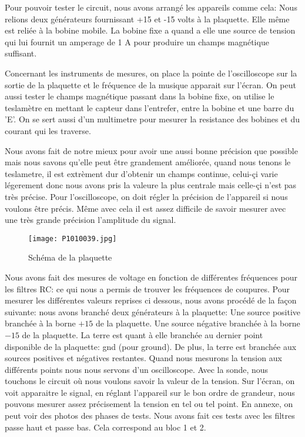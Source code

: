 

Pour pouvoir tester le circuit, nous avons arrangé les appareils comme cela: Nous relions deux générateurs fournissant +15 et
-15 volts à la plaquette. Elle même est reliée à la bobine mobile. La bobine fixe a quand a elle une source de tension qui
lui fournit un amperage de 1 A pour produire un champs magnétique suffisant.

Concernant les instruments de mesures, on place la pointe de l'oscilloscope sur la sortie de la plaquette et le fréquence
de la musique apparait sur l'écran. On peut aussi tester le champs magnétique passant dans la bobine fixe, on utilise le
teslamètre en mettant le capteur dans l'entrefer, entre la bobine et une barre du 'E'. On se sert aussi d'un multimetre
pour mesurer la resistance des bobines et du courant qui les traverse.

Nous avons fait de notre mieux pour avoir une aussi bonne précision que possible mais nous savons qu'elle peut être grandement
améliorée, quand nous tenons le teslametre, il est extrèment dur d'obtenir un champs continue, celui-çi varie légerement donc
nous avons pris la valeure la plus centrale mais celle-çi n'est pas très précise. Pour l'oscilloscope, on doit régler
la précision de l'appareil si nous voulons être précis. Même avec cela il est assez difficile de savoir mesurer avec une
très grande précision l'amplitude du signal.

\begin{figure}[ht!]
    \centering
    \texttt{[image: P1010039.jpg]}
    \caption{Schéma de la plaquette}
    \label{plaquette}
\end{figure}


Nous avons fait des mesures de voltage en fonction de différentes fréquences pour les filtres RC: ce qui nous a permis
de trouver les fréquences de coupures. Pour mesurer les différentes valeurs reprises ci dessous, nous avons procédé de la
façon suivante: nous avons branché deux générateurs à la plaquette: Une source positive branchée à la borne $+15$ de la plaquette.
Une source négative branchée à la borne $-15$ de la plaquette. La terre est quant à elle branchée au dernier point
disponible de la plaquette: gnd (pour ground). De plus, la terre est branchée aux sources positives et négatives
restantes. Quand nous mesurons la tension aux différents points nous nous servons d'un oscilloscope. Avec la sonde,
nous touchons le circuit où nous voulons savoir la valeur de la tension. Sur l'écran, on voit apparaitre le
signal, en réglant l'appareil sur le bon ordre de grandeur, nous pouvons mesurer assez précisement la tension en
tel ou tel point. En annexe, on peut voir des photos des phases de tests.
  Nous avons fait ces tests avec les filtres
passe haut et passe bas. Cela correspond au bloc 1 et 2.

